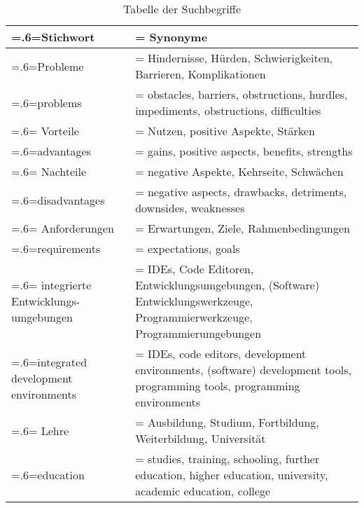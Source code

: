 \begin{table}[htbp]
    \centering
    \begin{tabularx}{\textwidth}{| >{\hsize=.6\hsize\linewidth=\hsize}X |
            >{\hsize=1.4\hsize\linewidth=\hsize}X |}
        \hline
        Stichwort                           & Synonyme                                                                                                                   \\
        \hline
        Probleme                            & Hindernisse, Hürden, Schwierigkeiten, Barrieren, Komplikationen                                                            \\ problems                            & obstacles, barriers, obstructions, hurdles, impediments, obstructions, difficulties \\
        \hline
        Vorteile                            & Nutzen, positive Aspekte, Stärken                                                                                          \\ advantages                          & gains, positive aspects, benefits, strengths \\
        \hline
        Nachteile                           & negative Aspekte, Kehrseite, Schwächen                                                                                     \\ disadvantages                       & negative aspects, drawbacks, detriments, downsides, weaknesses \\
        \hline
        Anforderungen                       & Erwartungen, Ziele, Rahmenbedingungen                                                                                      \\ requirements                        & expectations, goals \\
        \hline
        integrierte Entwicklungs-umgebungen & IDEs, Code Editoren, Entwicklungsumgebungen, (Software) Entwicklungswerkzeuge, Programmierwerkzeuge, Programmierumgebungen \\ integrated development environments & IDEs, code editors, development environments, (software) development tools, programming tools, programming environments \\
        \hline
        Lehre                               & Ausbildung, Studium, Fortbildung, Weiterbildung, Universität                                                               \\ education                           & studies, training, schooling, further education, higher education, university, academic education, college  \\
        \hline
    \end{tabularx}
    \caption{Tabelle der Suchbegriffe}
    \label{table:search-terms}
\end{table}

